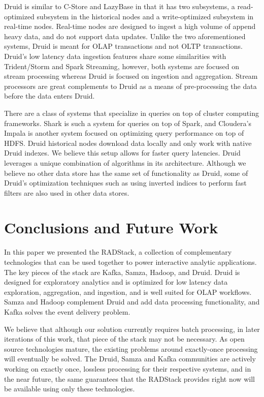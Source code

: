 \documentclass{vldb}
\begin{document}
Druid is similar to C-Store\cite{stonebraker2005c} and
LazyBase\cite{cipar2012lazybase} in that it has two subsystems, a
read-optimized subsystem in the historical nodes and a write-optimized
subsystem in real-time nodes. Real-time nodes are designed to ingest a high
volume of append heavy data, and do not support data updates. Unlike the two
aforementioned systems, Druid is meant for OLAP transactions and not OLTP
transactions. Druid’s low latency data ingestion features share some
similarities with Trident/Storm\cite{marz2013storm} and Spark
Streaming\cite{zaharia2012discretized}, however, both systems are focused on
stream processing whereas Druid is focused on ingestion and aggregation. Stream
processors are great complements to Druid as a means of pre-processing the data
before the data enters Druid. 

There are a class of systems that specialize in queries on top of cluster
computing frameworks. Shark\cite{engle2012shark} is such a system for queries
on top of Spark, and Cloudera’s Impala\cite{cloudera2013} is another system
focused on optimizing query performance on top of HDFS. Druid historical nodes
download data locally and only work with native Druid indexes. We believe this
setup allows for faster query latencies. Druid leverages a unique combination
of algorithms in its architecture. Although we believe no other data store has
the same set of functionality as Druid, some of Druid’s optimization techniques
such as using inverted indices to perform fast filters are also used in other
data stores\cite{macnicol2004sybase}. 

\section{Conclusions and Future Work}
\label{sec:conclusions}
In this paper we presented the RADStack, a collection of complementary
technologies that can be used together to power interactive analytic
applications. The key pieces of the stack are Kafka, Samza, Hadoop, and Druid.
Druid is designed for exploratory analytics and is optimized for low latency
data exploration, aggregation, and ingestion, and is well suited for OLAP
workflows. Samza and Hadoop complement Druid and add data processing
functionality, and Kafka solves the event delivery problem. 

We believe that although our solution currently requires batch processing, in
later iterations of this work, that piece of the stack may not be necessary. As
open source technologies mature, the existing problems around exactly-once
processing will eventually be solved. The Druid, Samza and Kafka communities
are actively working on exactly once, lossless processing for their respective
systems, and in the near future, the same guarantees that the RADStack provides
right now will be available using only these technologies.
\end{document}
